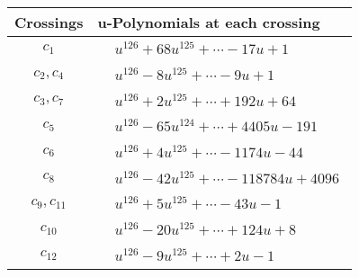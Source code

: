 \documentclass[1p]{elsarticle_modified}
\theoremstyle{definition}
\begin{document}
\begin{tabular}{m{50pt}|m{274pt}}
Crossings & \hspace{64pt}u-Polynomials at each crossing \\
\hline $$\begin{aligned}c_{1}\end{aligned}$$&$\begin{aligned}
&u^{126}+68 u^{125}+\cdots-17 u+1
\end{aligned}$\\
\hline $$\begin{aligned}c_{2},c_{4}\end{aligned}$$&$\begin{aligned}
&u^{126}-8 u^{125}+\cdots-9 u+1
\end{aligned}$\\
\hline $$\begin{aligned}c_{3},c_{7}\end{aligned}$$&$\begin{aligned}
&u^{126}+2 u^{125}+\cdots+192 u+64
\end{aligned}$\\
\hline $$\begin{aligned}c_{5}\end{aligned}$$&$\begin{aligned}
&u^{126}-65 u^{124}+\cdots+4405 u-191
\end{aligned}$\\
\hline $$\begin{aligned}c_{6}\end{aligned}$$&$\begin{aligned}
&u^{126}+4 u^{125}+\cdots-1174 u-44
\end{aligned}$\\
\hline $$\begin{aligned}c_{8}\end{aligned}$$&$\begin{aligned}
&u^{126}-42 u^{125}+\cdots-118784 u+4096
\end{aligned}$\\
\hline $$\begin{aligned}c_{9},c_{11}\end{aligned}$$&$\begin{aligned}
&u^{126}+5 u^{125}+\cdots-43 u-1
\end{aligned}$\\
\hline $$\begin{aligned}c_{10}\end{aligned}$$&$\begin{aligned}
&u^{126}-20 u^{125}+\cdots+124 u+8
\end{aligned}$\\
\hline $$\begin{aligned}c_{12}\end{aligned}$$&$\begin{aligned}
&u^{126}-9 u^{125}+\cdots+2 u-1
\end{aligned}$\\
\hline
\end{tabular}\\~\\
\end{document}
